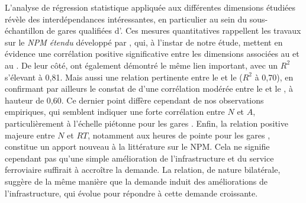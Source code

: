 \begin{refsegment}
L’analyse de régression statistique appliquée aux différentes dimensions étudiées révèle des interdépendances intéressantes, en particulier au sein du sous-échantillon de gares qualifiées d'. Ces mesures quantitatives rappellent les travaux sur le \textsl{NPM étendu} développé par \textcolor{blue}{\textcite[289]{vale_extended_2018}}, qui, à l'instar de notre étude, mettent en évidence une corrélation positive significative entre les dimensions associées au  et au . De leur côté, \textcolor{blue}{\textcite[10]{zhang_network_2019}} ont également démontré le même lien important, avec un \(R^2\) s'élevant à 0,81. Mais aussi une relation pertinente entre le  et le  (\(R^2\) à 0,70), en confirmant par ailleurs le constat de \textcolor{blue}{\textcite[289]{vale_extended_2018}} d’une corrélation modérée entre le  et le , à hauteur de 0,60. Ce dernier point diffère cependant de nos observations empiriques, qui semblent indiquer une forte corrélation entre \(N\) et \(A\), particulièrement à l’échelle piétonne pour les gares  \textcolor{blue}{\autocite[79]{papa_accessibility_2015}}. Enfin, la relation positive majeure entre \(N\) et \(RT\), notamment aux heures de pointe pour les gares , constitue un apport nouveau à la littérature sur le \acrshort{NPM}. Cela ne signifie cependant pas qu’une simple amélioration de l’infrastructure et du service ferroviaire suffirait à accroître la demande. La relation, de nature bilatérale, suggère de la même manière que la demande induit des améliorations de l’infrastructure, qui évolue pour répondre à cette demande croissante.%


\end{refsegment}
